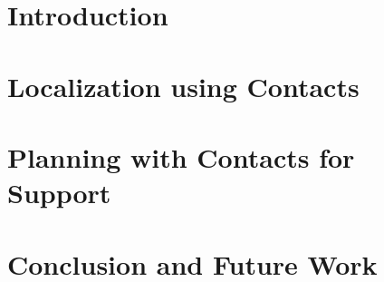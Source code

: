 \documentclass[hidelinks, 12pt]{cmuthesis}
\begin{document}
\chapter{Introduction}


\chapter{Localization using Contacts}


\chapter{Planning with Contacts for Support}


\chapter{Conclusion and Future Work}


%

\backmatter


\renewcommand{\bibsection}{\chapter{\bibname}}

\end{document}
